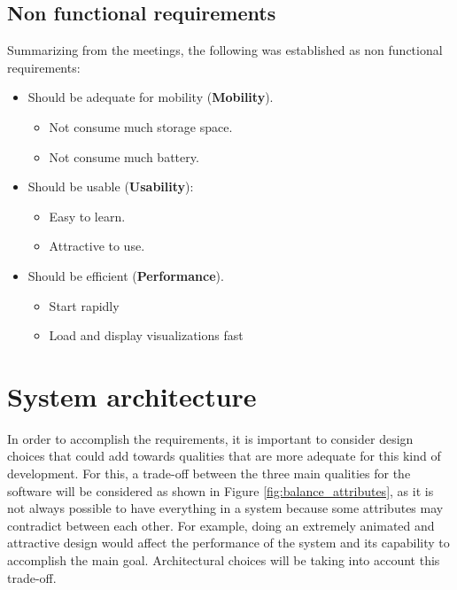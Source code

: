 \subsection{Non functional requirements}

Summarizing from the meetings, the following was established as non functional requirements:

\begin{itemize}
	\item Should be adequate for mobility (\textbf{Mobility}).
	\begin{itemize}
		\item Not consume much storage space.
		\item Not consume much battery.
	\end{itemize}
    \item Should be usable (\textbf{Usability}):
    \begin{itemize}
		\item Easy to learn.
        \item Attractive to use.
	\end{itemize}
    \item Should be efficient (\textbf{Performance}).
    \begin{itemize}
		\item Start rapidly
        \item Load and display visualizations fast
	\end{itemize}
    
\end{itemize}


\section{System architecture}
In order to accomplish the requirements, it is important to consider design choices that could add towards qualities that are more adequate for this kind of development. For this, a trade-off between the three main qualities for the software will be considered as shown in Figure \ref{fig:balance_attributes}, as it is not always possible to have everything in a system because some attributes may contradict between each other. For example, doing an extremely animated and attractive design would affect the performance of the system and its capability to accomplish the main goal. Architectural choices will be taking into account this trade-off.


